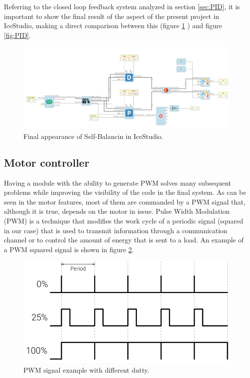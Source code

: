 Referring to the closed loop feedback system analyzed in section \ref{sec:PID}, it is important to show the final result of the aspect of the present project in IceStudio, making a direct comparison between this (figure \ref{fig:finalIceStudio} ) and figure \ref{fig:PID}.
\newpage
\begin{figure}[H]
	\center
	\includegraphics[scale=0.5, angle=90]{imagenes/Balancing_robot/finalIceStudio}
	\caption{Final appearance of Self-Balancin in IceStudio.}
	\label{fig:finalIceStudio}
\end{figure}

\subsection{Motor controller} \label{sec:driver_motores}
Having a module with the ability to generate PWM solves many subsequent problems while improving the visibility of the code in the final system. As can be seen in the motor features, most of them are commanded by a PWM signal that, although it is true, depends on the motor in issue. \newline
Pulse Width Modulation (PWM) is a technique that modifies the work cycle of a periodic signal (squared in our case) that is used to transmit information through a communication channel or to control the amount of energy that is sent to a load. An example of a PWM squared signal is shown in figure \ref{fig:pwm_example}.

\begin{figure}[H]
	\center
	\includegraphics[trim = 0mm 0cm 0mm 0cm, clip,scale=0.4]{imagenes/Balancing_robot/pwm_example.png}
	\caption{PWM signal example with different dutty.}
	\label{fig:pwm_example}
\end{figure}


